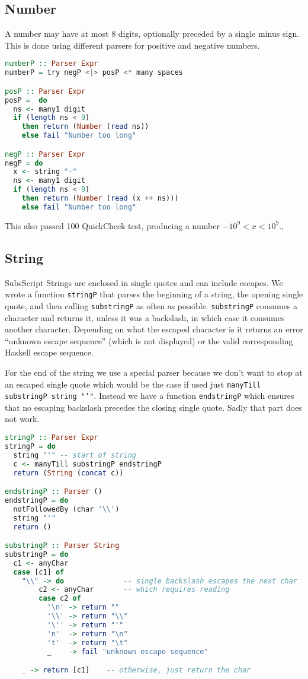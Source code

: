\documentclass{article}
\begin{document}
\subsection{Number}
A number may have at most 8 digits, optionally preceded by a single minus sign. This is done using different parsers for positive and negative numbers.
\begin{lstlisting}[language=Haskell]
numberP :: Parser Expr
numberP = try negP <|> posP <* many spaces

posP :: Parser Expr
posP =  do
  ns <- many1 digit
  if (length ns < 9)
    then return (Number (read ns))
    else fail "Number too long"

negP :: Parser Expr
negP = do
  x <- string "-"
  ns <- many1 digit
  if (length ns < 9)
    then return (Number (read (x ++ ns)))
    else fail "Number too long"
\end{lstlisting}
This also passed 100 QuickCheck test, producing a number $-10^9 < x< 10^9$.,

\subsection{String}

SubsScript Strings are enclosed in single quotes and can include escapes.
We wrote a function \texttt{stringP} that parses the beginning of a string, the opening single quote,
and then calling \texttt{substringP} as often as possible.
\texttt{substringP} consumes a character and returns it, unless it was a backslash,
in which case it consumes another character. Depending on what the escaped character is
it returns an error ``unknown escape sequence'' (which is not displayed) or the valid
corresponding Haskell escape sequence.

For the end of the string we use a special parser because we don't want to stop at an
escaped single quote which would be the case if used just \texttt{manyTill substringP string "'"}.
Instead we have a function \texttt{endstringP} which ensures that no escaping backslash precedes the closing single quote.
Sadly that part does not work.

\begin{lstlisting}[language=Haskell]
stringP :: Parser Expr
stringP = do
  string "'" -- start of string
  c <- manyTill substringP endstringP
  return (String (concat c))

endstringP :: Parser ()
endstringP = do
  notFollowedBy (char '\\')
  string "'"
  return ()

substringP :: Parser String
substringP = do
  c1 <- anyChar
  case [c1] of
    "\\" -> do              -- single backslash escapes the next char
        c2 <- anyChar       -- which requires reading
        case c2 of
          '\n' -> return ""
          '\\' -> return "\\"
          '\'' -> return "'"
          'n'  -> return "\n"
          't'  -> return "\t"
          _    -> fail "unknown escape sequence"

    _ -> return [c1]    -- otherwise, just return the char
\end{lstlisting}
\end{document}
